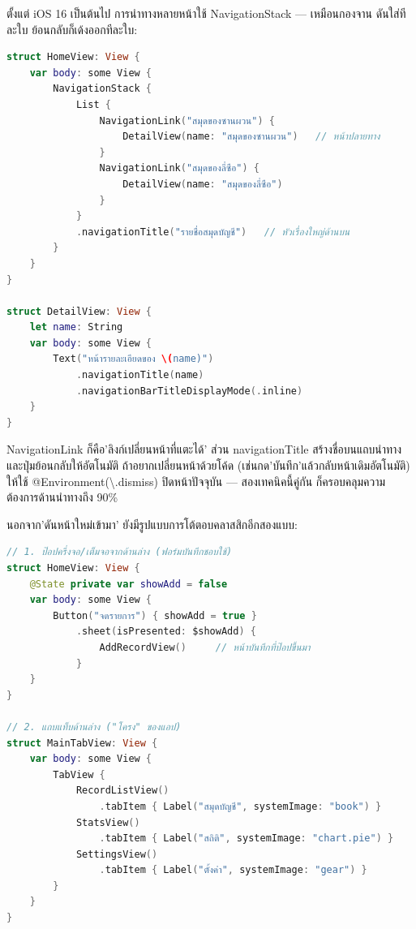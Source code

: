 
ตั้งแต่ iOS 16 เป็นต้นไป การนำทางหลายหน้าใช้ NavigationStack — เหมือนกองจาน ดันใส่ทีละใบ ย้อนกลับก็เด้งออกทีละใบ:

\begin{lstlisting}[language=Swift]
struct HomeView: View {
    var body: some View {
        NavigationStack {
            List {
                NavigationLink("สมุดของซานผวน") {
                    DetailView(name: "สมุดของซานผวน")   // หน้าปลายทาง
                }
                NavigationLink("สมุดของลี่ซือ") {
                    DetailView(name: "สมุดของลี่ซือ")
                }
            }
            .navigationTitle("รายชื่อสมุดบัญชี")   // หัวเรื่องใหญ่ด้านบน
        }
    }
}

struct DetailView: View {
    let name: String
    var body: some View {
        Text("หน้ารายละเอียดของ \(name)")
            .navigationTitle(name)
            .navigationBarTitleDisplayMode(.inline)
    }
}
\end{lstlisting}

NavigationLink ก็คือ'ลิงก์เปลี่ยนหน้าที่แตะได้' ส่วน navigationTitle สร้างชื่อบนแถบนำทางและปุ่มย้อนกลับให้อัตโนมัติ ถ้าอยากเปลี่ยนหน้าด้วยโค้ด (เช่นกด'บันทึก'แล้วกลับหน้าเดิมอัตโนมัติ) ให้ใช้ @Environment(\textbackslash{}.dismiss) ปิดหน้าปัจจุบัน — สองเทคนิคนี้คู่กัน ก็ครอบคลุมความต้องการด้านนำทางถึง 90\%


นอกจาก'ดันหน้าใหม่เข้ามา' ยังมีรูปแบบการโต้ตอบคลาสสิกอีกสองแบบ:

\begin{lstlisting}[language=Swift]
// 1. ป๊อปครึ่งจอ/เต็มจอจากด้านล่าง (ฟอร์มบันทึกชอบใช้)
struct HomeView: View {
    @State private var showAdd = false
    var body: some View {
        Button("จดรายการ") { showAdd = true }
            .sheet(isPresented: $showAdd) {
                AddRecordView()     // หน้าบันทึกที่ป๊อปขึ้นมา
            }
    }
}

// 2. แถบแท็บด้านล่าง ("โครง" ของแอป)
struct MainTabView: View {
    var body: some View {
        TabView {
            RecordListView()
                .tabItem { Label("สมุดบัญชี", systemImage: "book") }
            StatsView()
                .tabItem { Label("สถิติ", systemImage: "chart.pie") }
            SettingsView()
                .tabItem { Label("ตั้งค่า", systemImage: "gear") }
        }
    }
}
\end{lstlisting}

